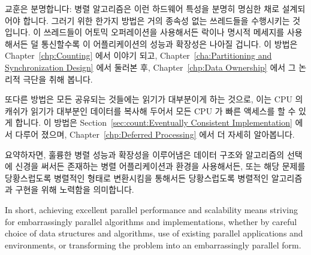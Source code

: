 교훈은 분명합니다:
병렬 알고리즘은 이런 하드웨어 특성을 분명히 명심한 채로 설계되어야 합니다.
그러기 위한 한가지 방법은 거의 종속성 없는 쓰레드들을 수행시키는 것입니다.
이 쓰레드들이 어토믹 오퍼레이션을 사용해서든 락이나 명시적 메세지를 사용해서든
덜 통신할수록 이 어플리케이션의 성능과 확장성은 나아질 겁니다.
이 방법은
Chapter~\ref{chp:Counting} 에서 이야기 되고,
Chapter~\ref{cha:Partitioning and Synchronization Design} 에서 둘러본 후,
Chapter~\ref{chp:Data Ownership} 에서 그 논리적 극단을 취해 봅니다.

또다른 방법은 모든 공유되는 것들에는 읽기가 대부분이게 하는 것으로, 이는 CPU 의
캐쉬가 읽기가 대부분인 데이터를 복사해 두어서 모든 CPU 가 빠른 액세스를 할 수
있게 합니다.
이 방법은
Section~\ref{sec:count:Eventually Consistent Implementation}
에서 다루어 졌으며,
Chapter~\ref{chp:Deferred Processing}
에서 더 자세히 알아봅니다.

\iffalse

The lesson should be quite clear:
parallel algorithms must be explicitly designed with these hardware
properties firmly in mind.
One approach is to run nearly independent threads.
The less frequently the threads communicate, whether by atomic operations,
locks, or explicit messages, the better the application's performance
and scalability will be.
This approach will be touched on in
Chapter~\ref{chp:Counting},
explored in
Chapter~\ref{cha:Partitioning and Synchronization Design},
and taken to its logical extreme in
Chapter~\ref{chp:Data Ownership}.

Another approach is to make sure that any sharing be read-mostly, which
allows the CPUs' caches to replicate the read-mostly data, in turn
allowing all CPUs fast access.
This approach is touched on in
Section~\ref{sec:count:Eventually Consistent Implementation},
and explored more deeply in
Chapter~\ref{chp:Deferred Processing}.

\fi

요약하자면, 훌륭한 병렬 성능과 확장성을 이루어냄은 데이터 구조와 알고리즘의
선택에 신경을 써서든 존재하는 병렬 어플리케이션과 환경을 사용해서든, 또는 해당
문제를 당황스럽도록 병렬적인 형태로 변환시킴을 통해서든 당황스럽도록 병렬적인
알고리즘과 구현을 위해 노력함을 의미합니다.

\iffalse

In short, achieving excellent parallel performance and scalability means
striving for embarrassingly parallel algorithms and implementations,
whether by careful choice of data structures and algorithms, use of
existing parallel applications and environments, or transforming the
problem into an embarrassingly parallel form.

